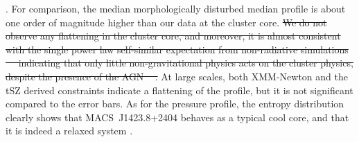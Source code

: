 \documentclass[twocolumn,traditabstract]{aa}
\providecommand{\DIFdeltex}[1]{{\protect\color{red}\sout{#1}}}                      %
\providecommand{\DIFaddend}{} %
\providecommand{\DIFdelbegin}{} %
\providecommand{\DIFdelend}{} %
\providecommand{\DIFdel}[1]{\texorpdfstring{\DIFdeltex{#1}}{}} %
\begin{document}
{{\citep{voit2005b}}%
. For comparison, the median }\DIFaddend morphologically disturbed median profile is about one order of magnitude higher than our data at the cluster core. \DIFdelbegin \DIFdel{We do not observe any flattening in the cluster core, and moreover, it is almost consistent with the single power law self-similar expectation from non-radiative simulations \mbox{%
\citep{voit2005b} }%
indicating that only little non-gravitational physics acts on the cluster physics, despite the presence of the AGN \mbox{%
\citep[see][for further discussions]{pratt2010}}%
. }\DIFdelend At large scales, both XMM-Newton and the tSZ derived constraints indicate a flattening of the profile, but it is not significant compared to the error bars. As for the pressure profile, the entropy distribution clearly shows that \mbox{MACS~J1423.8+2404} behaves as a typical cool core, and that it is indeed a relaxed system \citep[as discussed in Sect.~\ref{sec:Introduction}, e.g.][]{kartaltepe2008,limousin2010}. 
\end{document}
